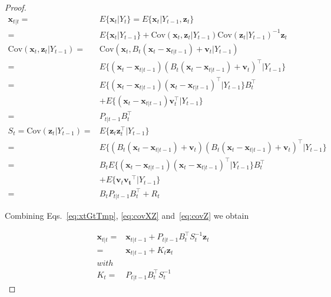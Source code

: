\documentclass[12pt]{article}
\begin{document}
\begin{proof}
    \begin{align}
        \mathbf{x}_{t|t}=&E\{\mathbf{x}_t|Y_t\}=E\{\mathbf{x}_t|Y_{t-1},\mathbf{z}_t\}\nonumber\\
                        =&E\{\mathbf{x}_t|Y_{t-1}\}+\text{Cov}\left(\mathbf{x}_t,\mathbf{z}_t|Y_{t-1}\right)\text{Cov}\left(\mathbf{z}_t|Y_{t-1}\right)^{-1}\mathbf{z}_t\label{eq:xtGtTmp}\\
        \text{Cov}\left(\mathbf{x}_t,\mathbf{z}_t|Y_{t-1}\right)=&\text{Cov}\left(\mathbf{x}_t,B_t(\mathbf{x}_t-\mathbf{x}_{t|t-1})+\mathbf{v}_t|Y_{t-1}\right)\nonumber\\
                                                                =&E\{(\mathbf{x}_t-\mathbf{x}_{t|t-1})(B_t(\mathbf{x}_t-\mathbf{x}_{t|t-1})+\mathbf{v}_t)^\intercal|Y_{t-1}\}\nonumber\\
                                                                =&E\{(\mathbf{x}_t-\mathbf{x}_{t|t-1})(\mathbf{x}_t-\mathbf{x}_{t|t-1})^\intercal|Y_{t-1}\}B_t^\intercal\nonumber\\
                                                                 &+E\{(\mathbf{x}_t-\mathbf{x}_{t|t-1})\mathbf{v}_t^\intercal|Y_{t-1}\}\nonumber\\
                                                                =&P_{t|t-1}B_t^\intercal\label{eq:covXZ}\\
        S_t=\text{Cov}\left(\mathbf{z}_t|Y_{t-1}\right)=&E\{\mathbf{z}_t\mathbf{z}_t^\intercal|Y_{t-1}\}\nonumber\\
                                                       =&E\{\left(B_t(\mathbf{x}_t-\mathbf{x}_{t|t-1})+\mathbf{v}_t\right)\left(B_t(\mathbf{x}_t-\mathbf{x}_{t|t-1})+\mathbf{v}_t\right)^\intercal|Y_{t-1}\}\nonumber\\
                                                       =&B_tE\{\left(\mathbf{x}_t-\mathbf{x}_{t|t-1}\right)\left(\mathbf{x}_t-\mathbf{x}_{t|t-1}\right)^\intercal|Y_{t-1}\}B_t^\intercal\nonumber\\
                                                        &+E\{\mathbf{v}_t\mathbf{v_t}^\intercal|Y_{t-1}\}\nonumber\\
                                                       =&B_tP_{t|t-1}B_t^\intercal+R_t\label{eq:covZ}
    \end{align}

    Combining Eqs.~\ref{eq:xtGtTmp}, \ref{eq:covXZ} and~\ref{eq:covZ} we obtain

    \begin{align}
        \mathbf{x}_{t|t}=&\mathbf{x}_{t|t-1}+P_{t|t-1}B_t^\intercal
        S_t^{-1}\mathbf{z}_t\nonumber\\
                        =&\mathbf{x}_{t|t-1}+K_t\mathbf{z}_t\nonumber\\
                     with&\nonumber\\
                    K_t=&P_{t|t-1}B_t^\intercal S_t^{-1}\nonumber
    \end{align}
\end{proof}
\end{document}
